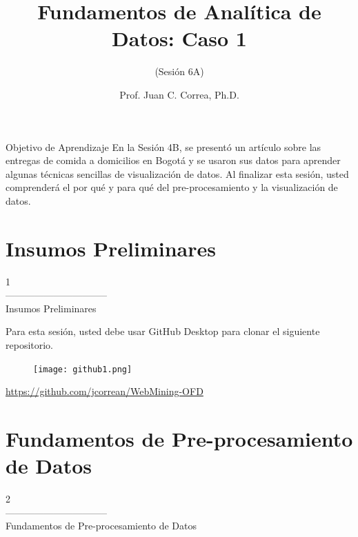 \documentclass[aspectratio=169]{beamer}
\title[Fundamentos de Analítica de Datos: Caso 1]{Fundamentos de Analítica de Datos: Caso 1}
\subtitle{(Sesión 6A)}
\author[Prof. Juan C. Correa, Ph.D.]{Prof. Juan C. Correa, Ph.D.}
\institute[]{
Colegio de Estudios Superiores de Administración\\
Bogotá - Colombia\\
}
\date[Bogotá, Agosto, 2021] %
{}
\begin{document}
\begin{frame}
\titlepage
\end{frame}


\begin{frame}
\begin{block}{Objetivo de Aprendizaje}
En la Sesión 4B, se presentó un artículo sobre las entregas de comida a domicilios en Bogotá y se usaron sus datos para aprender algunas técnicas sencillas de visualización de datos. Al finalizar esta sesión, usted comprenderá el por qué y para qué del pre-procesamiento y la visualización de datos.
\end{block}
\end{frame}

\section{Insumos Preliminares}
\begin{frame}
\begin{center}
\Huge
\textcolor{azulcesaclaro}{1\\
--------------------------------\\
Insumos Preliminares}
\end{center}
\end{frame}

\begin{frame}
Para esta sesión, usted debe usar GitHub Desktop para clonar el siguiente repositorio.
\begin{figure}
\centering
\texttt{[image: github1.png]}
\end{figure}
\centering
\textcolor{blue}{\url{https://github.com/jcorrean/WebMining-OFD}}
\end{frame}

\section{Fundamentos de Pre-procesamiento de Datos}
\begin{frame}
\begin{center}
\Huge
\textcolor{azulcesaclaro}{2\\
--------------------------------\\
Fundamentos de Pre-procesamiento de Datos}
\end{center}
\end{frame}
\end{document}
